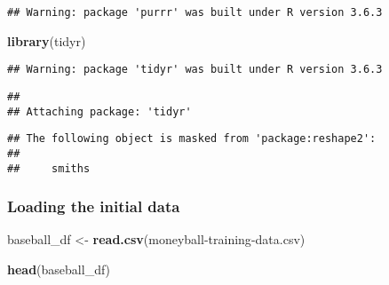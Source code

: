\documentclass[
]{article}
\newenvironment{Shaded}{\begin{snugshade}}{\end{snugshade}}
\newcommand{\KeywordTok}[1]{\textcolor[rgb]{0.13,0.29,0.53}{\textbf{#1}}}
\newcommand{\NormalTok}[1]{#1}
\newcommand{\StringTok}[1]{\textcolor[rgb]{0.31,0.60,0.02}{#1}}
\begin{document}
\begin{verbatim}
## Warning: package 'purrr' was built under R version 3.6.3
\end{verbatim}

\begin{Shaded}
\begin{Highlighting}[]
\KeywordTok{library}\NormalTok{(tidyr)}
\end{Highlighting}
\end{Shaded}

\begin{verbatim}
## Warning: package 'tidyr' was built under R version 3.6.3
\end{verbatim}

\begin{verbatim}
## 
## Attaching package: 'tidyr'
\end{verbatim}

\begin{verbatim}
## The following object is masked from 'package:reshape2':
## 
##     smiths
\end{verbatim}

\hypertarget{loading-the-initial-data}{%
\subsubsection{Loading the initial
data}\label{loading-the-initial-data}}

\begin{Shaded}
\begin{Highlighting}[]
\NormalTok{baseball\_df \textless{}{-}}\StringTok{ }\KeywordTok{read.csv}\NormalTok{(}\StringTok{\textquotesingle{}moneyball{-}training{-}data.csv\textquotesingle{}}\NormalTok{)}

\KeywordTok{head}\NormalTok{(baseball\_df)}
\end{Highlighting}
\end{Shaded}
\end{document}
